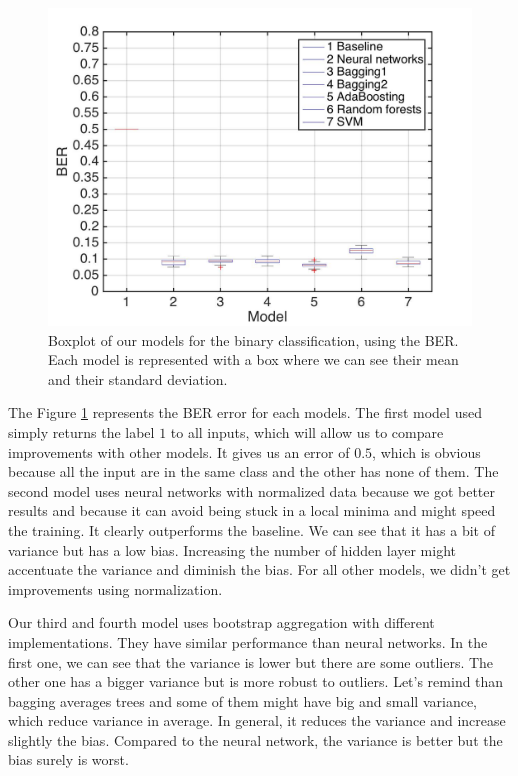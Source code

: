 \documentclass{article} %
\begin{document}
\begin{figure}
\center
\includegraphics[width=5in]{figures/binaryclassifications.jpg} 
\caption{Boxplot of our models for the binary classification, using the BER. Each model is represented with a box where we can see their mean and their standard deviation.}
\label{fig:bin_models}
\end{figure}

The Figure \ref{fig:bin_models} represents the BER error for each models. The first model used simply returns the label $1$ to all inputs, which will allow us to compare improvements with other models. It gives us an error of $0.5$, which is obvious because all the input are in the same class and the other has none of them. The second model uses neural networks with normalized data because we got better results and because it can avoid being stuck in a local minima and might speed the training. It clearly outperforms the baseline. We can see that it has a bit of variance but has a low bias. Increasing the number of hidden layer might accentuate the variance and diminish the bias. For all other models, we didn't get improvements using normalization.

Our third and fourth model uses bootstrap aggregation with different implementations. They have similar performance than neural networks. In the first one, we can see that the variance is lower but there are some outliers. The other one has a bigger variance but is more robust to outliers. Let's remind than bagging averages trees and some of them might have big and small variance, which reduce variance in average. In general, it reduces the variance and increase slightly the bias. Compared to the neural network, the variance is better but the bias surely is worst.
\end{document}
